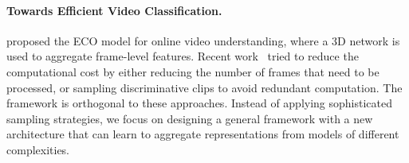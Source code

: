 \documentclass[10pt,twocolumn,letterpaper]{article}
\begin{document}
\paragraph{Towards Efficient Video Classification.} 
\cite{zolfaghari2018eco} proposed the ECO model for online video understanding, where a 3D network is used to aggregate frame-level features.  Recent work~\cite{alwassel2018actiOn,wu2019adaframe,korbar2019scsampler,bhardwaj2019efficient} tried to reduce the computational cost by either reducing the number of frames that need to be processed, or sampling discriminative clips to avoid redundant computation. The \oursfr framework is orthogonal to these approaches. Instead of applying sophisticated sampling strategies, we focus on designing a general framework with a new architecture that can learn to aggregate representations from models of different complexities. 
\end{document}
